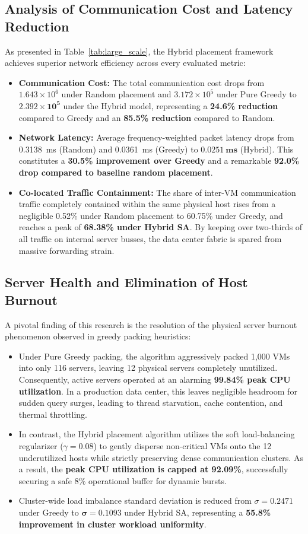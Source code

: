 \documentclass[conference]{IEEEtran}
\begin{document}
\subsection{Analysis of Communication Cost and Latency Reduction}
As presented in Table~\ref{tab:large_scale}, the Hybrid placement framework achieves superior network efficiency across every evaluated metric:
\begin{itemize}
    \item \textbf{Communication Cost:} The total communication cost drops from $1.643 \times 10^6$ under Random placement and $3.172 \times 10^5$ under Pure Greedy to $\mathbf{2.392 \times 10^5}$ under the Hybrid model, representing a \textbf{24.6\% reduction} compared to Greedy and an \textbf{85.5\% reduction} compared to Random.
    \item \textbf{Network Latency:} Average frequency-weighted packet latency drops from 0.3138~ms (Random) and 0.0361~ms (Greedy) to $\mathbf{0.0251~ms}$ (Hybrid). This constitutes a \textbf{30.5\% improvement over Greedy} and a remarkable \textbf{92.0\% drop compared to baseline random placement}.
    \item \textbf{Co-located Traffic Containment:} The share of inter-VM communication traffic completely contained within the same physical host rises from a negligible 0.52\% under Random placement to 60.75\% under Greedy, and reaches a peak of \textbf{68.38\% under Hybrid SA}. By keeping over two-thirds of all traffic on internal server busses, the data center fabric is spared from massive forwarding strain.
\end{itemize}

\subsection{Server Health and Elimination of Host Burnout}
A pivotal finding of this research is the resolution of the physical server burnout phenomenon observed in greedy packing heuristics:
\begin{itemize}
    \item Under Pure Greedy packing, the algorithm aggressively packed 1,000 VMs into only 116 servers, leaving 12 physical servers completely unutilized. Consequently, active servers operated at an alarming \textbf{99.84\% peak CPU utilization}. In a production data center, this leaves negligible headroom for sudden query surges, leading to thread starvation, cache contention, and thermal throttling.
    \item In contrast, the Hybrid placement algorithm utilizes the soft load-balancing regularizer ($\gamma = 0.08$) to gently disperse non-critical VMs onto the 12 underutilized hosts while strictly preserving dense communication clusters. As a result, the \textbf{peak CPU utilization is capped at 92.09\%}, successfully securing a safe 8\% operational buffer for dynamic bursts.
    \item Cluster-wide load imbalance standard deviation is reduced from $\sigma = 0.2471$ under Greedy to $\mathbf{\sigma = 0.1093}$ under Hybrid SA, representing a \textbf{55.8\% improvement in cluster workload uniformity}.
\end{itemize}
\end{document}
